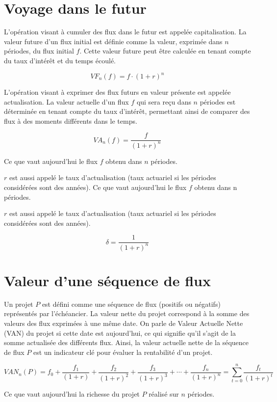 \documentclass[a4paper, 12pt]{report}
\begin{document}
\section{Voyage dans le futur}

L'opération visant à cumuler des flux dans le futur est appelée capitalisation. La valeur future d'un flux initial est définie comme la valeur, exprimée dans \( n \) périodes, du flux initial \( f \). Cette valeur future peut être calculée en tenant compte du taux d'intérêt et du temps écoulé.

\[ VF_n(f)=f\cdot(1+r)^n \]

L'opération visant à exprimer des flux futurs en valeur présente est appelée actualisation. La valeur actuelle d'un flux \( f \) qui sera reçu dans \( n \) périodes est déterminée en tenant compte du taux d'intérêt, permettant ainsi de comparer des flux à des moments différents dans le temps.

\[ VA_n(f)= \frac{f}{(1+r)^n} \]

Ce que vaut aujourd'hui le flux \( f \) obtenu dans \( n \) périodes.

\( r \) est aussi appelé le taux  d'actualisation (taux actuariel si les périodes considérées sont des années).
Ce que vaut aujourd'hui le flux \( f \) obtenu dans n périodes.

\( r \) est aussi appelé le taux d'actualisation (taux actuariel si les périodes considérées sont des années).

\[ \delta = \frac{1}{(1+r)^n} \]

\section{Valeur d'une séquence de flux}

Un projet \( P \) est défini comme une séquence de flux (positifs ou négatifs) représentés par l'échéancier. La valeur nette du projet correspond à la somme des valeurs des flux exprimées à une même date. On parle de Valeur Actuelle Nette (VAN) du projet si cette date est aujourd'hui, ce qui signifie qu'il s'agit de la somme actualisée des différents flux. Ainsi, la valeur actuelle nette de la séquence de flux \( P \) est un indicateur clé pour évaluer la rentabilité d'un projet.

\[ VAN_n(P)=f_0+\frac{f_1}{(1+r)}+\frac{f_2}{(1+r)^2}+\frac{f_3}{(1+r)^3}+\cdots+\frac{f_n}{(1+r)^n} = \sum_{t=0}^{n}\frac{f_t}{(1+r)^t}\]

Ce que vaut aujourd'hui la richesse du projet \( P \) réalisé sur \( n \) périodes.
\end{document}
